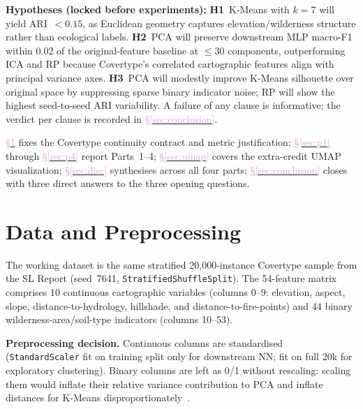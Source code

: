 \documentclass[conference]{IEEEtran}
\newcommand{\secref}[1]{\hyperref[#1]{\textcolor{plum}{\S\ref*{#1}}}}
\begin{document}
\textbf{Hypotheses (locked before experiments):}
\textbf{H1}~K-Means with $k{=}7$ will yield ARI~$<0.15$, as Euclidean
geometry captures elevation/wilderness structure rather than ecological labels.
\textbf{H2}~PCA will preserve downstream MLP macro-F1 within 0.02 of the
original-feature baseline at $\leq 30$ components, outperforming ICA and RP
because Covertype's correlated cartographic features align with principal
variance axes.
\textbf{H3}~PCA will modestly improve K-Means silhouette over original space
by suppressing sparse binary indicator noise; RP will show the highest
seed-to-seed ARI variability.
A failure of any clause is informative; the verdict per clause is recorded
in \secref{sec:conclusion}.

\secref{sec:data} fixes the Covertype continuity contract and metric
justification; \secref{sec:p1} through \secref{sec:p4} report Parts~1--4;
\secref{sec:umap} covers the extra-credit UMAP visualization;
\secref{sec:disc} synthesises across all four parts;
\secref{sec:conclusion} closes with three direct answers to the three
opening questions.

\section{Data and Preprocessing}\label{sec:data}

The working dataset is the same stratified 20,000-instance Covertype sample
from the SL Report (seed~7641, \texttt{StratifiedShuffleSplit}).
The 54-feature matrix comprises 10 continuous cartographic variables (columns
0--9: elevation, aspect, slope, distance-to-hydrology, hillshade, and
distance-to-fire-points) and 44 binary wilderness-area/soil-type indicators
(columns 10--53).

\textbf{Preprocessing decision.}
Continuous columns are standardised (\texttt{StandardScaler} fit on training
split only for downstream NN; fit on full 20k for exploratory clustering).
Binary columns are left as 0/1 without rescaling: scaling them would inflate
their relative variance contribution to PCA and inflate distances for K-Means
disproportionately~\cite{jolliffe2002pca}.
\end{document}
